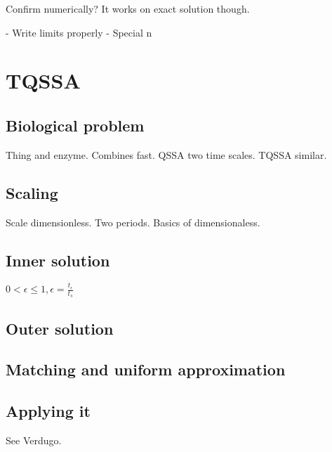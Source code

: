 \documentclass[12pt]{report}
\begin{document}
Confirm numerically? It works on exact solution though.


- Write limits properly
- Special n

\chapter{TQSSA}

\section{Biological problem}

Thing and enzyme. Combines fast. QSSA two time scales. TQSSA similar.

\section{Scaling}

Scale dimensionless. Two periods. Basics of dimensionaless.

\section{Inner solution}

$0 < \epsilon \leq 1, \epsilon = \frac{t_{\epsilon}}{t_{s}}$

\section{Outer solution}

\section{Matching and uniform approximation}

\section{Applying it}

See Verdugo.


\end{document}
